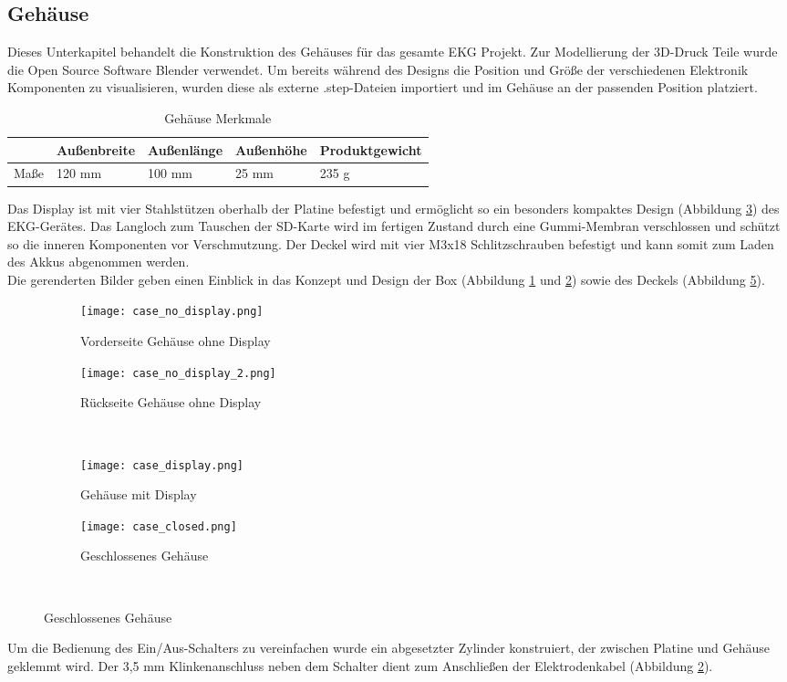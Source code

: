 \subsection{Gehäuse}
Dieses Unterkapitel behandelt die Konstruktion des Gehäuses für das gesamte EKG Projekt. Zur Modellierung der 3D-Druck Teile wurde die Open Source Software Blender \cite{Blender} verwendet. Um bereits während des Designs die Position und Größe der verschiedenen Elektronik Komponenten zu visualisieren, wurden diese als externe .step-Dateien importiert und im Gehäuse an der passenden Position platziert.

\begin{table}[h]
\centering
\caption{Gehäuse Merkmale}
\begin{tabular}[h]{l|l|l|l|l}
		& Außenbreite & Außenlänge & Außenhöhe & Produktgewicht \\
\hline
Maße 	& 120 mm & 100 mm & 25 mm & 235 g \\
\end{tabular}
\end{table}

Das Display ist mit vier Stahlstützen oberhalb der Platine befestigt und ermöglicht so ein besonders kompaktes Design (Abbildung \ref{case_display}) des EKG-Gerätes. Das Langloch zum Tauschen der SD-Karte wird im fertigen Zustand durch eine Gummi-Membran verschlossen und schützt so die inneren Komponenten vor Verschmutzung. Der Deckel wird mit vier M3x18 Schlitzschrauben befestigt und kann somit zum Laden des Akkus abgenommen werden. \\
Die gerenderten Bilder geben einen Einblick in das Konzept und Design der Box (Abbildung \ref{case_no_display1} und \ref{case_no_display2}) sowie des Deckels (Abbildung \ref{case_closed}).

\begin{figure}[t]
	\begin{subfigure}[t]{0.49\textwidth}
		\texttt{[image: case\_no\_display.png]}
		\caption{Vorderseite Gehäuse ohne Display}
		\label{case_no_display1}
	\end{subfigure}\hfill%
	\begin{subfigure}[t]{0.49\textwidth}
		\texttt{[image: case\_no\_display\_2.png]}
		\caption{Rückseite Gehäuse ohne Display}
		\label{case_no_display2}
	\end{subfigure}\\[5pt]%
	
	\begin{subfigure}[t]{0.49\textwidth}
		\texttt{[image: case\_display.png]}
		\caption{Gehäuse mit Display}
		\label{case_display}
	\end{subfigure}\hfill%
	\begin{subfigure}[t]{0.49\textwidth}
		\texttt{[image: case\_closed.png]}
		\caption{Geschlossenes Gehäuse}
		\label{case_closed} 
	\end{subfigure}\\[5pt]%

\end{figure}

Um die Bedienung des Ein/Aus-Schalters zu vereinfachen wurde ein abgesetzter Zylinder konstruiert, der zwischen Platine und Gehäuse geklemmt wird. Der 3,5 mm Klinkenanschluss neben dem Schalter dient zum Anschließen der Elektrodenkabel (Abbildung \ref{case_no_display2}).